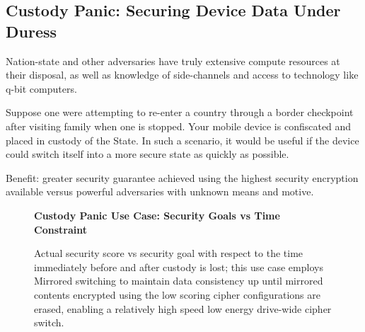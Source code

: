 \subsection{Custody Panic: Securing Device Data Under Duress}

Nation-state and other adversaries have truly extensive compute resources at
their disposal, as well as knowledge of side-channels and access to technology
like q-bit computers.

Suppose one were attempting to re-enter a country through a border checkpoint
after visiting family when one is stopped. Your mobile device is confiscated and
placed in custody of the State. In such a scenario, it would be useful if the
device could switch itself into a more secure state as quickly as possible.

Benefit: greater security guarantee achieved using the highest security
encryption available versus powerful adversaries with unknown means and motive.

\begin{figure}[ht] \textbf{Custody Panic Use Case: Security Goals vs Time
Constraint}\par\medskip
   \centering
   {} \caption{Actual security score vs
   security goal with respect to the time immediately before and after custody
   is lost; this use case employs Mirrored switching to maintain data
   consistency up until mirrored contents encrypted using the low scoring cipher
   configurations are erased, enabling a relatively high speed low energy
   drive-wide cipher switch.}
  \label{fig:usecase-custody}
\end{figure}

